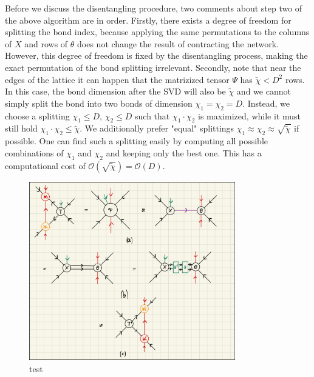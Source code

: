 Before we discuss the disentangling procedure, two comments about step two of the above algorithm are in order. Firstly, there exists a degree of freedom for splitting the bond index, because applying the same permutations to the columns of $X$ and rows of $\theta$ does not change the result of contracting the network. However, this degree of freedom is fixed by the disentangling process, making the exact permutation of the bond splitting irrelevant. Secondly, note that near the edges of the lattice it can happen that the matrizized tensor $\Psi$ has $\tilde{\chi} < D^2$ rows. In this case, the bond dimension after the SVD will also be $\tilde{\chi}$ and we cannot simply split the bond into two bonds of dimension $\chi_1=\chi_2=D$. Instead, we choose a splitting $\chi_1 \le D$, $\chi_2 \le D$ such that $\chi_1\cdot\chi_2$ is maximized, while it must still hold $\chi_1\cdot\chi_2\le\tilde{\chi}$. We additionally prefer "equal" splittings $\chi_1\approx\chi_2\approx\sqrt{\tilde{\chi}}$ if possible. One can find such a splitting easily by computing all possible combinations of $\chi_1$ and $\chi_2$ and keeping only the best one. This has a computational cost of $\mathcal{O}\left(\sqrt{\tilde{\chi}}\right) = \mathcal{O}\left(D\right)$. \par
\begin{figure}
	\centering
	\includegraphics[width=0.8\textwidth]{figures/Tensor_Networks/yb_move_svd_disent.jpeg}
	\caption{test}
	\label{fig:yb_move_svd_disent}
\end{figure}
